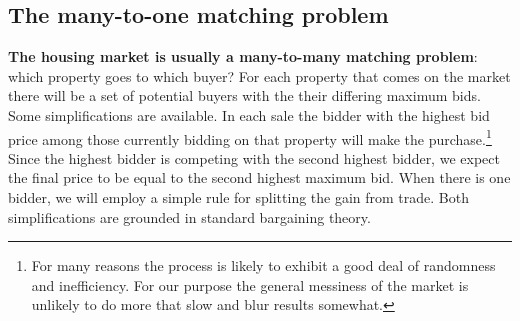 




\subsection{The many-to-one matching problem}
\textbf{The housing market is usually a many-to-many matching problem}: which property  goes to which buyer? For each property that comes on the market  there will be a set of potential buyers with the their differing  maximum bids. Some simplifications are available. In each sale the bidder with the highest bid price among those currently bidding on that property will make the purchase.\footnote{For many reasons the process is likely to exhibit a good deal of randomness and inefficiency. For our purpose the general messiness of the market is unlikely to do more that slow and blur results somewhat.} Since the highest bidder is competing with the second highest bidder, we expect the final price to be equal to the second highest maximum bid.
When there is one bidder, we will employ a simple rule for splitting the gain from trade. Both simplifications are grounded in standard bargaining theory.



